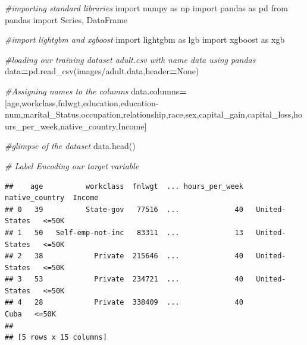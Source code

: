 \documentclass[
]{book}
\newenvironment{Shaded}{\begin{snugshade}}{\end{snugshade}}
\newcommand{\CommentTok}[1]{\textcolor[rgb]{0.56,0.35,0.01}{\textit{#1}}}
\newcommand{\ImportTok}[1]{#1}
\newcommand{\NormalTok}[1]{#1}
\newcommand{\OperatorTok}[1]{\textcolor[rgb]{0.81,0.36,0.00}{\textbf{#1}}}
\newcommand{\StringTok}[1]{\textcolor[rgb]{0.31,0.60,0.02}{#1}}
\newcommand{\VariableTok}[1]{\textcolor[rgb]{0.00,0.00,0.00}{#1}}
\begin{document}
\begin{Shaded}
\begin{Highlighting}[]
\CommentTok{\#importing standard libraries }
\ImportTok{import}\NormalTok{ numpy }\ImportTok{as}\NormalTok{ np }
\ImportTok{import}\NormalTok{ pandas }\ImportTok{as}\NormalTok{ pd }
\ImportTok{from}\NormalTok{ pandas }\ImportTok{import}\NormalTok{ Series, DataFrame }

\CommentTok{\#import lightgbm and xgboost }
\ImportTok{import}\NormalTok{ lightgbm }\ImportTok{as}\NormalTok{ lgb }
\ImportTok{import}\NormalTok{ xgboost }\ImportTok{as}\NormalTok{ xgb }

\CommentTok{\#loading our training dataset \textquotesingle{}adult.csv\textquotesingle{} with name \textquotesingle{}data\textquotesingle{} using pandas }
\NormalTok{data}\OperatorTok{=}\NormalTok{pd.read\_csv(}\StringTok{\textquotesingle{}images/adult.data\textquotesingle{}}\NormalTok{,header}\OperatorTok{=}\VariableTok{None}\NormalTok{) }

\CommentTok{\#Assigning names to the columns }
\NormalTok{data.columns}\OperatorTok{=}\NormalTok{[}\StringTok{\textquotesingle{}age\textquotesingle{}}\NormalTok{,}\StringTok{\textquotesingle{}workclass\textquotesingle{}}\NormalTok{,}\StringTok{\textquotesingle{}fnlwgt\textquotesingle{}}\NormalTok{,}\StringTok{\textquotesingle{}education\textquotesingle{}}\NormalTok{,}\StringTok{\textquotesingle{}education{-}num\textquotesingle{}}\NormalTok{,}\StringTok{\textquotesingle{}marital\_Status\textquotesingle{}}\NormalTok{,}\StringTok{\textquotesingle{}occupation\textquotesingle{}}\NormalTok{,}\StringTok{\textquotesingle{}relationship\textquotesingle{}}\NormalTok{,}\StringTok{\textquotesingle{}race\textquotesingle{}}\NormalTok{,}\StringTok{\textquotesingle{}sex\textquotesingle{}}\NormalTok{,}\StringTok{\textquotesingle{}capital\_gain\textquotesingle{}}\NormalTok{,}\StringTok{\textquotesingle{}capital\_loss\textquotesingle{}}\NormalTok{,}\StringTok{\textquotesingle{}hours\_per\_week\textquotesingle{}}\NormalTok{,}\StringTok{\textquotesingle{}native\_country\textquotesingle{}}\NormalTok{,}\StringTok{\textquotesingle{}Income\textquotesingle{}}\NormalTok{] }

\CommentTok{\#glimpse of the dataset }
\NormalTok{data.head() }

\CommentTok{\# Label Encoding our target variable }
\end{Highlighting}
\end{Shaded}

\begin{verbatim}
##    age          workclass  fnlwgt  ... hours_per_week  native_country  Income
## 0   39          State-gov   77516  ...             40   United-States   <=50K
## 1   50   Self-emp-not-inc   83311  ...             13   United-States   <=50K
## 2   38            Private  215646  ...             40   United-States   <=50K
## 3   53            Private  234721  ...             40   United-States   <=50K
## 4   28            Private  338409  ...             40            Cuba   <=50K
## 
## [5 rows x 15 columns]
\end{verbatim}
\end{document}
